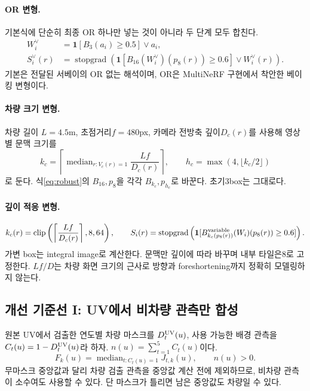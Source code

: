\documentclass[11pt,a4paper]{article}
\newcommand{\ind}{\mathbf{1}}
\newcommand{\sg}{\operatorname{stopgrad}}
\newcommand{\med}{\operatorname{median}}
\begin{document}
\paragraph{OR 변형.}
기본식에 단순히 최종 OR 하나만 넣는 것이 아니라 두 단계 모두 합친다.
\begin{align}
 W_i^{\lor}&=\ind[B_3(a_i)\ge0.5]\lor a_i,\\
 S_i^{\lor}(r)&=\sg\left(\ind[B_{16}(W_i^{\lor})(p_8(r))\ge0.6]\lor W_i^{\lor}(r)\right).
\end{align}
기본은 전달된 서베이의 OR 없는 해석이며, OR은 MultiNeRF 구현에서 착안한 베이킹 변형이다.

\paragraph{차량 크기 변형.}
차량 길이 $L=4.5$m, 초점거리$f=480$px, 카메라 전방축 깊이$D_c(r)$를 사용해 영상별 문맥 크기를
\begin{equation}
 k_c=\left\lceil\med_{r:V_c(r)=1}\frac{Lf}{D_c(r)}\right\rceil,
 \qquad h_c=\max(4,\lfloor k_c/2\rfloor)
\end{equation}
로 둔다. 식\eqref{eq:robust}의 $B_{16},p_8$을 각각 $B_{k_c},p_{h_c}$로 바꾼다. 초기3box는 그대로다.

\paragraph{깊이 적응 변형.}
\begin{equation}
 k_c(r)=\operatorname{clip}\left(\left\lceil\frac{Lf}{D_c(r)}\right\rceil,8,64\right),\qquad
 S_i(r)=\sg\left(\ind[B_{k_c(p_8(r))}^{\rm variable}(W_i)(p_8(r))\ge0.6]\right).
\end{equation}
가변 box는 integral image로 계산한다. 문맥만 깊이에 따라 바꾸며 내부 타일은8로 고정한다. $Lf/D$는 차량 화면 크기의 근사로 방향과 foreshortening까지 정확히 모델링하지 않는다.

\subsection{개선 기준선 I: UV에서 비차량 관측만 합성}
원본 UV에서 검출한 연도별 차량 마스크를 $D_t^{\rm UV}(u)$, 사용 가능한 배경 관측을 $C_t(u)=1-D_t^{\rm UV}(u)$라 하자. $n(u)=\sum_{t=1}^5C_t(u)$이다.
\begin{equation}
 F_k(u)=\med_{t:C_t(u)=1}J_{t,k}(u),\qquad n(u)>0.\label{eq:fusion}
\end{equation}
무마스크 중앙값과 달리 차량 검출 관측을 중앙값 계산 전에 제외하므로, 비차량 관측이 소수여도 사용할 수 있다. 단 마스크가 틀리면 남은 중앙값도 차량일 수 있다.
\end{document}
